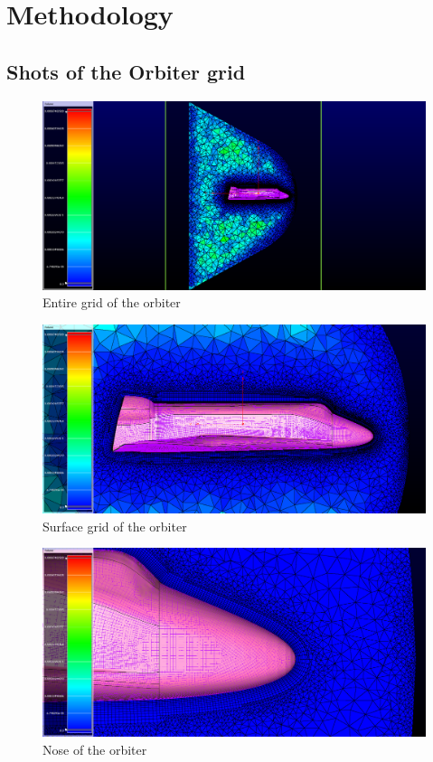 \section{Methodology}

\subsection{Shots of the Orbiter grid}


\begin{figure}[H]
 \centering
 \includegraphics[width=\textwidth]{report_images/ss_entire_grid_trex_final.png}
 \caption{Entire grid of the orbiter}
 \label{fig: ss_entire_gred}
\end{figure}

\begin{figure}[H]
 \centering
 \includegraphics[width=\textwidth]{report_images/ss_surface_grid_trex_final.png}
 \caption{Surface grid of the orbiter}
 \label{fig: ss_surface_grid}
\end{figure}

\begin{figure}[H]
 \centering
 \includegraphics[width=\textwidth]{report_images/ss_nose_LE_trex_final.png}
 \caption{Nose of the orbiter}
 \label{fig: ss_nose_LE}
\end{figure}

